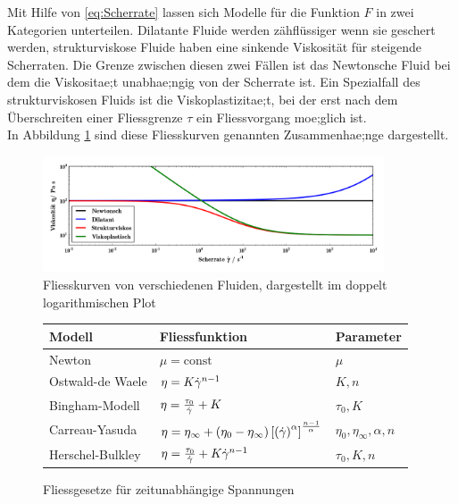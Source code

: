 Mit Hilfe von \eqref{eq:Scherrate} lassen sich Modelle für die Funktion $F$ in zwei Kategorien unterteilen. Dilatante Fluide werden zähflüssiger wenn sie geschert werden, strukturviskose Fluide haben eine sinkende Viskosität für steigende Scherraten. 
Die Grenze zwischen diesen zwei Fällen ist das Newtonsche Fluid bei dem die Viskositae;t unabhae;ngig von der Scherrate ist. 
Ein Spezialfall des strukturviskosen Fluids ist die Viskoplastizitae;t, bei der erst nach dem Überschreiten einer Fliessgrenze $\tau$ ein Fliessvorgang moe;glich ist.\\
In Abbildung \ref{fig:fliessKurven} sind diese Fliesskurven genannten Zusammenhae;nge dargestellt.
%
\begin{figure}
    \centering
    \includegraphics[width=0.9\textwidth]{figures/Fliesskurven.png}
    \caption{Fliesskurven von verschiedenen Fluiden, dargestellt im doppelt logarithmischen Plot}
    \label{fig:fliessKurven}
\end{figure}
%
\begin{figure}
    \centering
    \begin{tabular}{l l l}
        Modell & Fliessfunktion & Parameter \\
        \hline
        Newton & $\mu= \mbox{const}$ & $\mu$ \\ 
        Ostwald-de Waele & $\eta=K \dot\gamma^{n-1}$ & $K,n$ \\ 
        Bingham-Modell & $\eta= \frac{\tau_0}{\dot\gamma}+K $ & $\tau_0,K$ \\ 
        Carreau-Yasuda & $\eta=\eta_\infty+\left( \eta_0-\eta_\infty \right)\left[ \left( \dot\gamma \right)^\alpha \right] ^{\frac{n-1}{\alpha}} $ & $\eta_0,\eta_\infty,\alpha,n$ \\ 
        Herschel-Bulkley & $\eta= \frac{\tau_0}{\dot\gamma}+K\dot\gamma^{n-1} $ & $\tau_0,K,n$ \\ 
        
        
    \end{tabular}
    \caption{Fliessgesetze für zeitunabhängige Spannungen}
    \label{tab:Fliessgesetze}
\end{figure}
%

